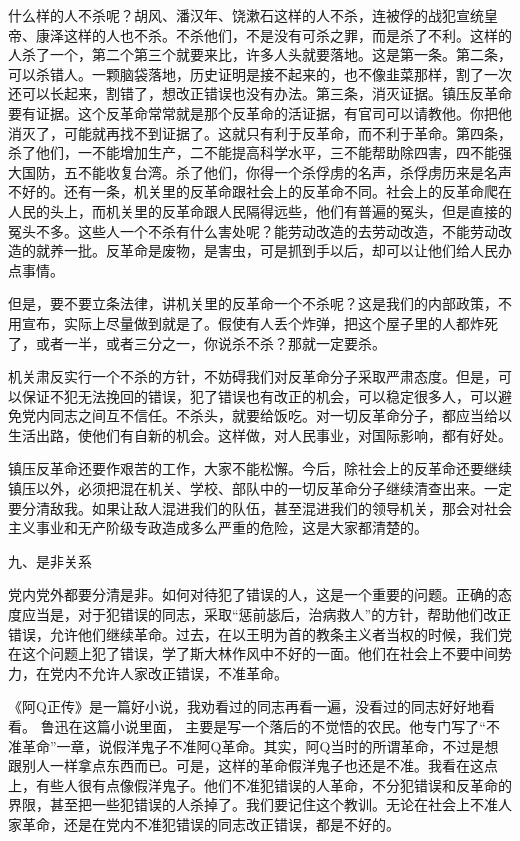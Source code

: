 \documentclass[UTF8, 12pt, a4paper]{ctexrep}
\begin{document}
什么样的人不杀呢？胡风、潘汉年、饶漱石这样的人不杀，连被俘的战犯宣统皇帝、康泽这样的人也不杀。不杀他们，不是没有可杀之罪，而是杀了不利。这样的人杀了一个，第二个第三个就要来比，许多人头就要落地。这是第一条。第二条，可以杀错人。一颗脑袋落地，历史证明是接不起来的，也不像韭菜那样，割了一次还可以长起来，割错了，想改正错误也没有办法。第三条，消灭证据。镇压反革命要有证据。这个反革命常常就是那个反革命的活证据，有官司可以请教他。你把他消灭了，可能就再找不到证据了。这就只有利于反革命，而不利于革命。第四条，杀了他们，一不能增加生产，二不能提高科学水平，三不能帮助除四害，四不能强大国防，五不能收复台湾。杀了他们，你得一个杀俘虏的名声，杀俘虏历来是名声不好的。还有一条，机关里的反革命跟社会上的反革命不同。社会上的反革命爬在人民的头上，而机关里的反革命跟人民隔得远些，他们有普遍的冤头，但是直接的冤头不多。这些人一个不杀有什么害处呢？能劳动改造的去劳动改造，不能劳动改造的就养一批。反革命是废物，是害虫，可是抓到手以后，却可以让他们给人民办点事情。

但是，要不要立条法律，讲机关里的反革命一个不杀呢？这是我们的内部政策，不用宣布，实际上尽量做到就是了。假使有人丢个炸弹，把这个屋子里的人都炸死了，或者一半，或者三分之一，你说杀不杀？那就一定要杀。

机关肃反实行一个不杀的方针，不妨碍我们对反革命分子采取严肃态度。但是，可以保证不犯无法挽回的错误，犯了错误也有改正的机会，可以稳定很多人，可以避免党内同志之间互不信任。不杀头，就要给饭吃。对一切反革命分子，都应当给以生活出路，使他们有自新的机会。这样做，对人民事业，对国际影响，都有好处。

镇压反革命还要作艰苦的工作，大家不能松懈。今后，除社会上的反革命还要继续镇压以外，必须把混在机关、学校、部队中的一切反革命分子继续清查出来。一定要分清敌我。如果让敌人混进我们的队伍，甚至混进我们的领导机关，那会对社会主义事业和无产阶级专政造成多么严重的危险，这是大家都清楚的。

九、是非关系

党内党外都要分清是非。如何对待犯了错误的人，这是一个重要的问题。正确的态度应当是，对于犯错误的同志，采取“惩前毖后，治病救人”的方针，帮助他们改正错误，允许他们继续革命。过去，在以王明为首的教条主义者当权的时候，我们党在这个问题上犯了错误，学了斯大林作风中不好的一面。他们在社会上不要中间势力，在党内不允许人家改正错误，不准革命。

《阿Q正传》是一篇好小说，我劝看过的同志再看一遍，没看过的同志好好地看看。 鲁迅在这篇小说里面， 主要是写一个落后的不觉悟的农民。他专门写了“不准革命”一章，说假洋鬼子不准阿Q革命。其实，阿Q当时的所谓革命，不过是想跟别人一样拿点东西而已。可是，这样的革命假洋鬼子也还是不准。我看在这点上，有些人很有点像假洋鬼子。他们不准犯错误的人革命，不分犯错误和反革命的界限，甚至把一些犯错误的人杀掉了。我们要记住这个教训。无论在社会上不准人家革命，还是在党内不准犯错误的同志改正错误，都是不好的。
\end{document}

